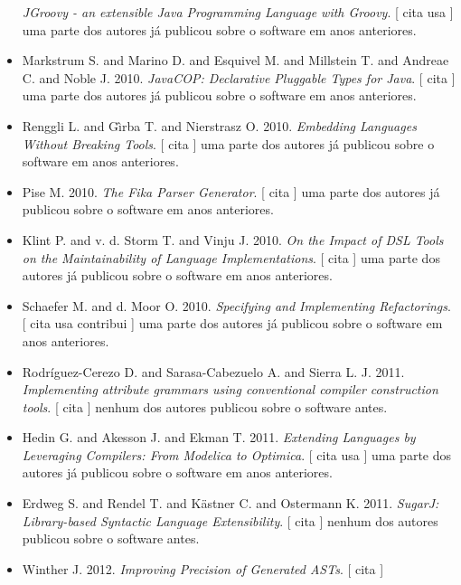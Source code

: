 \begin{itemize}
        \textit{ JGroovy - an extensible Java Programming Language with Groovy}.
      [
          cita
          usa
      ]
uma parte dos autores já publicou sobre o software em anos anteriores.
\item Markstrum S. and Marino D. and Esquivel M. and Millstein T. and Andreae C. and Noble J.
      2010.
        \textit{ JavaCOP: Declarative Pluggable Types for Java}.
      [
          cita
      ]
uma parte dos autores já publicou sobre o software em anos anteriores.
\item Renggli L. and G\^{\i}rba T. and Nierstrasz O.
      2010.
        \textit{ Embedding Languages Without Breaking Tools}.
      [
          cita
      ]
uma parte dos autores já publicou sobre o software em anos anteriores.
\item Pise M.
      2010.
        \textit{ The Fika Parser Generator}.
      [
          cita
      ]
uma parte dos autores já publicou sobre o software em anos anteriores.
\item Klint P. and v. d. Storm T. and Vinju J.
      2010.
        \textit{ On the Impact of DSL Tools on the Maintainability of Language Implementations}.
      [
          cita
      ]
uma parte dos autores já publicou sobre o software em anos anteriores.
\item Schaefer M. and d. Moor O.
      2010.
        \textit{ Specifying and Implementing Refactorings}.
      [
          cita
          usa
          contribui
      ]
uma parte dos autores já publicou sobre o software em anos anteriores.
\item Rodríguez-Cerezo D. and Sarasa-Cabezuelo A. and Sierra L. J.
      2011.
        \textit{ Implementing attribute grammars using conventional compiler construction tools}.
      [
          cita
      ]
nenhum dos autores publicou sobre o software antes.
\item Hedin G. and Akesson J. and Ekman T.
      2011.
        \textit{ Extending Languages by Leveraging Compilers: From Modelica to Optimica}.
      [
          cita
          usa
      ]
uma parte dos autores já publicou sobre o software em anos anteriores.
\item Erdweg S. and Rendel T. and K\"{a}stner C. and Ostermann K.
      2011.
        \textit{ SugarJ: Library-based Syntactic Language Extensibility}.
      [
          cita
      ]
nenhum dos autores publicou sobre o software antes.
\item Winther J.
      2012.
        \textit{ Improving Precision of Generated ASTs}.
      [
          cita
      ]

\end{itemize}
